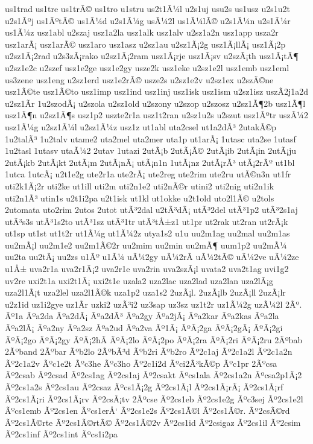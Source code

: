 {us1trad
us1tre
us1trÃ©
us1tro
u1stru
us2t1Ã¼l
u2s1uj
usu2s
us1usz
u2s1u2t
u2s1Ãºj
us1ÃºtÃ©
us1Ã¼d
u2s1Ã¼g
usÃ¼2l
us1Ã¼lÃ©
u2s1Ã¼n
u2s1Ã¼r
us1Ã¼z
usz1abl
u2szaj
usz1a2la
usz1alk
usz1alv
u2sz1a2n
usz1app
usza2r
usz1arÃ¡
usz1arÃ©
usz1aro
usz1asz
u2sz1au
u2sz1Ã¡2g
usz1Ã¡llÃ¡
usz1Ã¡2p
u2sz1Ã¡2rad
u2s3zÃ¡rako
u2sz1Ã¡2ram
usz1Ã¡rje
usz1Ã¡sv
u2szÃ¡th
usz1Ã¡tÃ¶
u2sz1e2c
u2szef
usz1e2ge
usz1e2gy
usze2k
usz1eke
u2sz1e2l
usz1emb
usz1eml
us3zene
usz1eng
u2sz1erd
usz1e2rÃ©
usze2s
u2sz1e2v
u2sz1ex
u2szÃ©ne
usz1Ã©te
usz1Ã©to
usz1imp
usz1ind
usz1inj
usz1isk
usz1ism
u2sz1isz
uszÃ­2j1a2d
u2sz1Ã­r
1u2szodÃ¡
u2szola
u2sz1old
u2szony
u2szop
u2szosz
u2sz1Ã¶2b
usz1Ã¶l
usz1Ã¶n
u2sz1Ã¶s
usz1p2
uszte2r1a
usz1t2ran
u2sz1u2s
u2szut
usz1Ãºtr
uszÃ¼2
usz1Ã¼g
u2sz1Ã¼l
u2sz1Ã¼z
usz1z
ut1abl
uta2csel
ut1a2dÃ³
2utakÃ©p
1u2talÃ³
1u2talv
utame2
uta2mel
uta2mer
uta1p
ut1arÃ¡
1utasc
uta2se
1utasf
1u2tasl
1utasv
utaÃ¼2
2utav
1utazi
2utÃ¡b
2utÃ¡Ã©
2utÃ¡ib
2utÃ¡in
2utÃ¡ju
2utÃ¡kb
2utÃ¡kt
2utÃ¡m
2utÃ¡nÃ¡
utÃ¡n1n
1utÃ¡nz
2utÃ¡rÃ³
utÃ¡2rÃº
ut1bl
1utca
1utcÃ¡
u2t1e2g
ute2r1a
ute2rÃ¡
ute2reg
ute2rim
ute2ru
utÃ©n3n
ut1fr
uti2k1Ã¡2r
uti2ke
ut1ill
uti2m
uti2n1e2
uti2nÃ©r
utini2
uti2nig
uti2n1ik
uti2n1Ã³
utin1s
u2t1i2pa
u2t1isk
ut1kl
ut1okke
u2t1old
uto2l1Ã©
u2tols
2utomata
uto2rim
2utos
2utot
utÃ³2dal
u2tÃ³dÃ¡
utÃ³2del
utÃ³1p2
utÃ³2s1aj
utÃ³s3s
utÃ³1s2to
utÃ³1sz
utÃ³1tr
utÃ³tÅ±z1
ut1pr
ut2rak
ut2ran
ut2rÃ¡k
ut1sp
ut1st
ut1t2r
ut1Ã¼g
ut1Ã¼2z
utya1s2
u1u
uu2m1ag
uu2mal
uu2m1as
uu2mÃ¡l
uu2m1e2
uu2m1Ã©2r
uu2mim
uu2min
uu2mÃ¶
uum1p2
uu2mÃ¼
uu2ta
uu2tÃ¡
uu2zs
u1Ãº
u1Ã¼
uÃ¼2gy
uÃ¼2rÃ­
uÃ¼2tÃ©
uÃ¼2ve
uÃ¼2ze
u1Å±
uva2r1a
uva2r1Ã¡2
uva2r1e
uva2rin
uva2szÃ¡l
uvata2
uva2t1ag
uvi1g2
uv2re
uxi2t1a
uxi2t1Ã¡
uxi2t1e
uzala2
uza2lac
uza2lad
uza2lan
uza2lÃ¡g
uza2l1Ã¡t
uza2lel
uza2l1Ã©k
uza1p2
uza1s2
2uzÃ¡l.
2uzÃ¡lb
2uzÃ¡ll
2uzÃ¡lr
u2z1id
uz1i2gye
uz1Ã­r
uzki2
uzÃ³i2
uz3sap
uz3sz
uz1t2r
uz1Ã¼2g
uzÃ¼2l
2Ãº.
Ãº1a
Ãºa2da
Ãºa2dÃ¡
Ãºa2dÃ³
Ãºa2gy
Ãºa2jÃ¡
Ãºa2kar
Ãºa2kas
Ãºa2la
Ãºa2lÃ¡
Ãºa2ny
Ãºa2sz
Ãºa2ud
Ãºa2va
Ãº1Ã¡
ÃºÃ¡2ga
ÃºÃ¡2gÃ¡
ÃºÃ¡2gi
ÃºÃ¡2go
ÃºÃ¡2gy
ÃºÃ¡2hÃ­
ÃºÃ¡2lo
ÃºÃ¡2po
ÃºÃ¡2ra
ÃºÃ¡2ri
ÃºÃ¡2ru
2Ãºbab
2Ãºband
2Ãºbar
Ãºb2lo
2ÃºbÃ³d
Ãºb2ri
Ãºb2ro
Ãº2c1aj
Ãº2c1a2l
Ãº2c1a2n
Ãº2c1a2v
Ãºc1e2t
Ãºc3he
Ãºc3ho
Ãº2c1i2d
Ãºci2Ã³kÃ©p
Ãºc1pr
2Ãºcsa
Ãº2csab
Ãº2csad
Ãº2cs1ag
Ãº2cs1aj
Ãº2csakt
Ãºcs1ala
Ãº2cs1a2n
Ãºcsa2p1Ã¡2
Ãº2cs1a2s
Ãº2cs1au
Ãº2csaz
Ãºcs1Ã¡2g
Ãº2cs1Ã¡l
Ãº2cs1Ã¡rÃ¡
Ãº2cs1Ã¡rf
Ãº2cs1Ã¡ri
Ãº2cs1Ã¡rv
Ãº2csÃ¡tv
2Ãºcse
Ãº2cs1eb
Ãº2cs1e2g
Ãºc3sej
Ãº2cs1e2l
Ãºcs1emb
Ãº2cs1en
Ãºcs1erÅ‘
Ãº2cs1e2s
Ãº2cs1Ã©l
Ãº2cs1Ã©r.
Ãº2csÃ©rd
Ãº2cs1Ã©rte
Ãº2cs1Ã©rtÃ©
Ãº2cs1Ã©2v
Ãº2cs1id
Ãº2csigaz
Ãº2cs1il
Ãº2csim
Ãº2cs1inf
Ãº2cs1int
Ãºcs1i2pa
}
